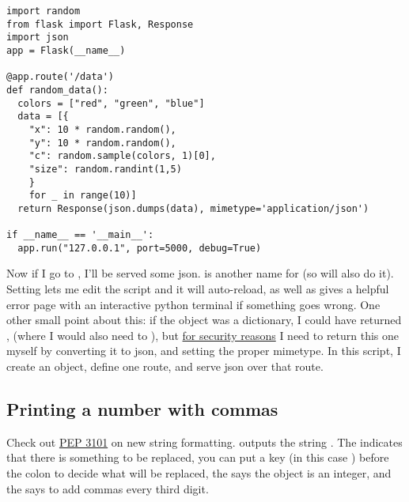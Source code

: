 \begin{lstlisting}[style=script]
import random
from flask import Flask, Response
import json
app = Flask(__name__)

@app.route('/data')
def random_data():
  colors = ["red", "green", "blue"]
  data = [{
    "x": 10 * random.random(),
    "y": 10 * random.random(),
    "c": random.sample(colors, 1)[0],
    "size": random.randint(1,5)
    }
    for _ in range(10)]
  return Response(json.dumps(data), mimetype='application/json')

if __name__ == '__main__':
  app.run("127.0.0.1", port=5000, debug=True)
\end{lstlisting}

Now if I go to , I'll be served some json.  
 is another name for  (so 
 will also do it).  Setting 
lets me edit the script and it will auto-reload, as well as gives a
helpful error page with an interactive python terminal if something
goes wrong.  One other small point about this: if the 
object was a dictionary, I could have returned ,
(where I would also need to ), but 
\href{http://stackoverflow.com/questions/12435297/how-do-i-jsonify-a-list-in-flask}{for security reasons}
I need to return this one myself by converting it to json, and 
setting the proper mimetype.
In this script, I create an  object, define one route,
and serve json over that route.

\subsection{Printing a number with commas}

Check out \href{http://legacy.python.org/dev/peps/pep-3101/}{PEP 3101}
on new string formatting.   outputs
the string .  The \code{\{\ldots\}} indicates that there
is something to be replaced, you can put a key (in this case ) before
the colon to decide what will be replaced, the  says the object is an
integer, and the \code{,} says to add commas every third digit.
